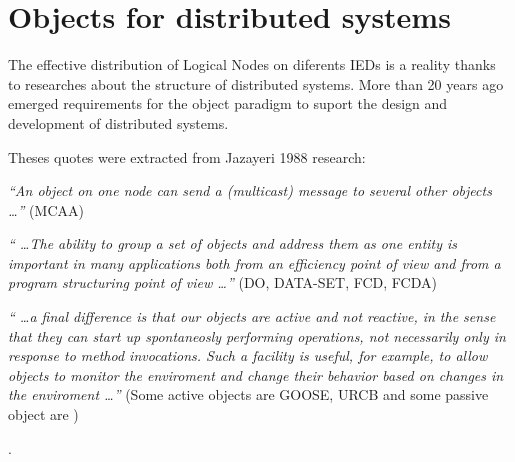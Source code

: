 \section{Objects for distributed systems}

The effective distribution of Logical Nodes 
on diferents IEDs  
is a reality thanks to researches about 
the structure of distributed systems. More 
than 20 years ago emerged requirements 
for the object paradigm to suport the 
design and development of distributed systems.

Theses quotes were extracted from Jazayeri 
1988 research:

\emph{
``An object on one node can send a (multicast) message 
to several other objects \ldots''
} (MCAA) 

\emph{
`` \ldots The ability to group 
a set of objects and address them as one entity 
is important in many applications both from an 
efficiency point of view and from a program 
structuring point of view \ldots'' 
} (DO, DATA-SET, FCD, FCDA)

\emph{
`` \ldots a final 
difference is that our objects are active and 
not reactive, in the sense that they can start 
up spontaneosly performing operations, not 
necessarily only in response to method invocations.
Such a facility is useful, for example, to allow objects 
to monitor the enviroment and change their behavior based 
on changes in the enviroment \ldots'' 
} (Some active objects 
are GOOSE, URCB and some passive object 
are )

\cite{Jazayeri:1988}.



 
